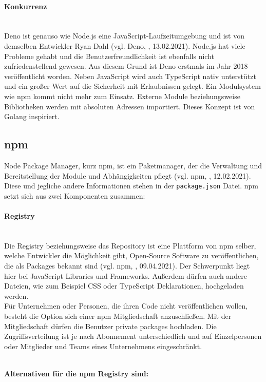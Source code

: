 \paragraph{Konkurrenz}
\mbox{}\\
Deno ist genauso wie Node.js eine JavaScript-Laufzeitumgebung und ist von demselben Entwickler Ryan Dahl (vgl. Deno, \cite{deno_2021}, 13.02.2021). Node.js hat viele Probleme gehabt und die Benutzerfreundlichkeit ist ebenfalls nicht zufriedenstellend gewesen. Aus diesem Grund ist Deno erstmals im Jahr 2018 veröffentlicht worden. Neben JavaScript wird auch TypeScript nativ unterstützt und ein großer Wert auf die Sicherheit mit Erlaubnissen gelegt. Ein Modulsystem wie npm kommt nicht mehr zum Einsatz. Externe Module beziehungsweise Bibliotheken werden mit absoluten Adressen importiert. Dieses Konzept ist von Golang inspiriert.

\subsection{npm}
Node Package Manager, kurz npm, ist ein Paketmanager, der die Verwaltung und Bereitstellung der Module und Abhängigkeiten pflegt (vgl. npm, \cite{npm_2021}, 12.02.2021). Diese und jegliche andere Informationen stehen in der \texttt{package.json} Datei. npm setzt sich aus zwei Komponenten zusammen:

\paragraph{Registry}
\mbox{}\\
Die Registry beziehungsweise das Repository ist eine Plattform von npm selber, welche Entwickler die Möglichkeit gibt, Open-Source Software zu veröffentlichen, die als Packages bekannt sind (vgl. npm, \cite{npm_registry_2021}, 09.04.2021). Der Schwerpunkt liegt hier bei JavaScript Libraries und Frameworks. Außerdem dürfen auch andere Dateien, wie zum Beispiel CSS oder TypeScript Deklarationen, hochgeladen werden.
\\
Für Unternehmen oder Personen, die ihren Code nicht veröffentlichen wollen, besteht die Option sich einer npm Mitgliedschaft anzuschließen. Mit der Mitgliedschaft dürfen die Benutzer private packages hochladen. Die Zugriffsverteilung ist je nach Abonnement unterschiedlich und auf Einzelpersonen oder Mitglieder und Teams eines Unternehmens eingeschränkt.

\mbox{}\\
\textbf{Alternativen für die npm Registry sind:}

